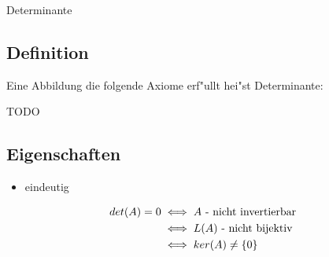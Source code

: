 \documentclass[class=article, crop=false]{standalone}
\begin{document}
\begin{zettel}{Determinante}

\subsection*{Definition}

Eine Abbildung die folgende Axiome erf"ullt hei"st Determinante:

TODO

\subsection*{Eigenschaften}
\begin{itemize}
    \item eindeutig
\end{itemize}

\begin{align*}
    det(A) =  0 &\iff A \text{ - nicht invertierbar }\\
                & \iff L(A) \text{ - nicht bijektiv }\\
                & \iff ker(A) \neq \set{0}\\
\end{align*}

\end{zettel}
\end{document}
